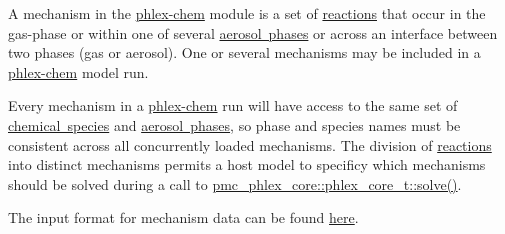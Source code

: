 A mechanism in the \mbox{\hyperlink{phlex_chem}{phlex-\/chem}} module is a set of \mbox{\hyperlink{phlex_rxn}{reactions}} that occur in the gas-\/phase or within one of several \mbox{\hyperlink{phlex_aero_phase}{aerosol phases}} or across an interface between two phases (gas or aerosol). One or several mechanisms may be included in a \mbox{\hyperlink{phlex_chem}{phlex-\/chem}} model run.

Every mechanism in a \mbox{\hyperlink{phlex_chem}{phlex-\/chem}} run will have access to the same set of \mbox{\hyperlink{phlex_species}{chemical species}} and \mbox{\hyperlink{phlex_aero_phase}{aerosol phases}}, so phase and species names must be consistent across all concurrently loaded mechanisms. The division of \mbox{\hyperlink{phlex_rxn}{reactions}} into distinct mechanisms permits a host model to specificy which mechanisms should be solved during a call to {\ttfamily \mbox{\hyperlink{structpmc__phlex__core_1_1phlex__core__t_af0904c4e6ce9e56cb932e06a6fe4066f}{pmc\+\_\+phlex\+\_\+core\+::phlex\+\_\+core\+\_\+t\+::solve()}}}.

The input format for mechanism data can be found \mbox{\hyperlink{input_format_mechanism}{here}}. 